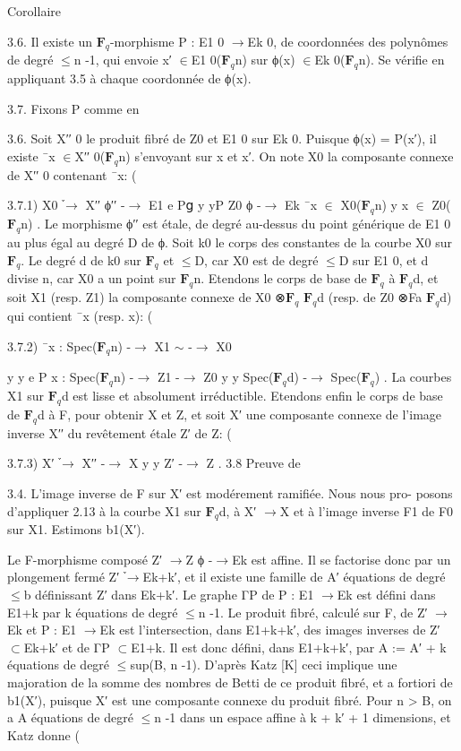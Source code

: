 \documentclass[11pt]{article}
\begin{document}
Corollaire 

3.6. Il existe un \(\mathbf F_q\)-morphisme P : E1 0 \(\to\)Ek 0, de coordonnées des polynômes de degré \(\le\)n -1, qui envoie x′ \(\in\)E1 0(\(\mathbf F_q\)n) sur ϕ(x) \(\in\)Ek 0(\(\mathbf F_q\)n). Se vérifie en appliquant 3.5 à chaque coordonnée de ϕ(x). 

3.7. Fixons P comme en 

3.6. Soit X′′ 0 le produit fibré de Z0 et E1 0 sur Ek 0. Puisque ϕ(x) = P(x′), il existe ¯x \(\in\)X′′ 0(\(\mathbf F_q\)n) s’envoyant sur x et x′. On note X0 la composante connexe de X′′ 0 contenant ¯x: (

3.7.1) X0 ֒\(\to\) X′′ ϕ′′ -\(\to\) E1 e Pց y yP Z0 ϕ -\(\to\) Ek ¯x \(\in\) X0(\(\mathbf F_q\)n) y x \(\in\) Z0(\(\mathbf F_q\)n) . Le morphisme ϕ′′ est étale, de degré au-dessus du point générique de E1 0 au plus égal au degré D de ϕ. Soit k0 le corps des constantes de la courbe X0 sur \(\mathbf F_q\). Le degré d de k0 sur \(\mathbf F_q\) et \(\le\)D, car X0 est de degré \(\le\)D sur E1 0, et d divise n, car X0 a un point sur \(\mathbf F_q\)n. Etendons le corps de base de \(\mathbf F_q\) à \(\mathbf F_q\)d, et soit X1 (resp. Z1) la composante connexe de X0 ⊗\(\mathbf F_q\) \(\mathbf F_q\)d (resp. de Z0 ⊗Fa \(\mathbf F_q\)d) qui contient ¯x (resp. x): (

3.7.2) ¯x : Spec(\(\mathbf F_q\)n) -\(\to\) X1 \(\sim\) -\(\to\) X0

y y e P x : Spec(\(\mathbf F_q\)n) -\(\to\) Z1 -\(\to\) Z0 y y Spec(\(\mathbf F_q\)d) -\(\to\) Spec(\(\mathbf F_q\)) . La courbes X1 sur \(\mathbf F_q\)d est lisse et absolument irréductible. Etendons enfin le corps de base de \(\mathbf F_q\)d à F, pour obtenir X et Z, et soit X′ une composante connexe de l’image inverse X′′ du revêtement étale Z′ de Z: (

3.7.3) X′ ֒\(\to\) X′′ -\(\to\) X y y Z′ -\(\to\) Z . 3.8 Preuve de 

3.4. L’image inverse de F sur X′ est modérement ramifiée. Nous nous pro- posons d’appliquer 2.13 à la courbe X1 sur \(\mathbf F_q\)d, à X′ \(\to\)X et à l’image inverse F1 de F0 sur X1. Estimons b1(X′).

Le F-morphisme composé Z′ \(\to\)Z ϕ -\(\to\)Ek est affine. Il se factorise donc par un plongement fermé Z′ ֒\(\to\)Ek+k′, et il existe une famille de A′ équations de degré \(\le\)b définissant Z′ dans Ek+k′. Le graphe ΓP de P : E1 \(\to\)Ek est défini dans E1+k par k équations de degré \(\le\)n -1. Le produit fibré, calculé sur F, de Z′ \(\to\)Ek et P : E1 \(\to\)Ek est l’intersection, dans E1+k+k′, des images inverses de Z′ \(\subset\)Ek+k′ et de ΓP \(\subset\)E1+k. Il est donc défini, dans E1+k+k′, par A := A′ + k équations de degré \(\le\)sup(B, n -1). D’après Katz [K] ceci implique une majoration de la somme des nombres de Betti de ce produit fibré, et a fortiori de b1(X′), puisque X′ est une composante connexe du produit fibré. Pour n > B, on a A équations de degré \(\le\)n -1 dans un espace affine à k + k′ + 1 dimensions, et Katz donne (
\end{document}
